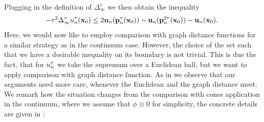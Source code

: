 %
Plugging in the definition of $\Delta^\tau_\infty$ we then obtain the inequality
%
\begin{align*}
-\tau^2\Delta^\tau_\infty u_n^\tau(\mathbf{x}_0)
\leq 2\mathbf{u}_n(\mathbf{p}_n^\tau(\mathbf{x}_0)) - 
\mathbf{u}_n(\mathbf{p}_n^{2\tau}(\mathbf{x}_0)) - 
\mathbf{u}_n (\mathbf{x}_0).
\end{align*}
%
%
Here, we would now like to employ comparison with graph distance functions for a similar strategy as in the continuum case. However, the choice of the set such that we have a desirable inequality on its boundary is not trivial. This is due the fact, that for $u^\tau_n$ we take the supremum over a Euclidean ball, but we want to apply comparison with graph distance function. As in \cite{roith2022continuum} we observe that our arguments need more care, whenever the Euclidean and the graph distance meet. We remark how the situation changes from the comparison with cones application in the continuum, where we assume that $\phi\equiv 0$ for simplicity, the concrete details are given in \cite[Sec. 5.2]{bungert2021uniform}:
%
